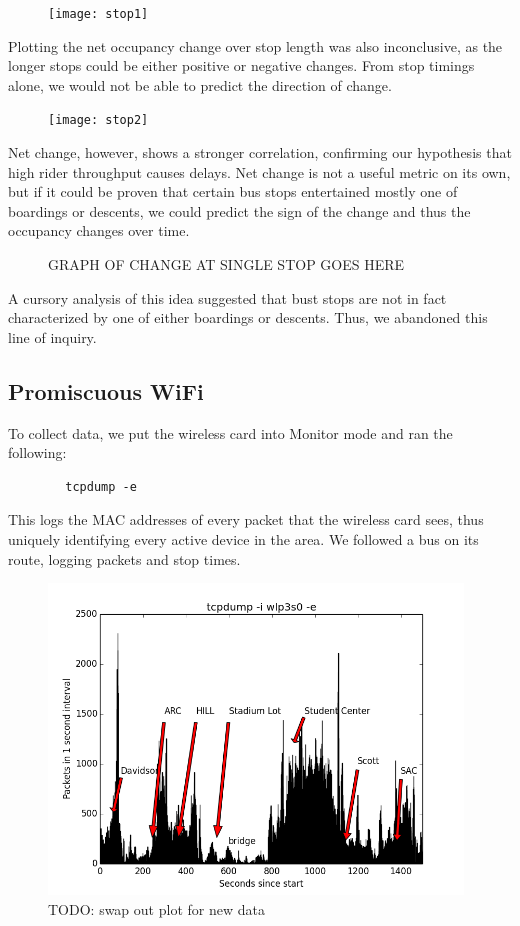 \documentclass[letterpaper]{scrartcl}
\begin{document}
	\begin{figure}[H]
	\texttt{[image: stop1]}
	\centering
	\end{figure}

	Plotting the net occupancy change over stop length was also inconclusive, as the longer stops could be either positive or negative changes.
	From stop timings alone, we would not be able to predict the direction of change.

	\begin{figure}[H]
	\texttt{[image: stop2]}
	\centering
	\end{figure}

	Net change, however, shows a stronger correlation, confirming our hypothesis that high rider throughput causes delays.
	Net change is not a useful metric on its own, but if it could be proven that certain bus stops entertained mostly one of boardings or descents, we could predict the sign of the change and thus the occupancy changes over time.

	\begin{figure}[H]
	GRAPH OF CHANGE AT SINGLE STOP GOES HERE
	\centering
	\end{figure}

	A cursory analysis of this idea suggested that bust stops are not in fact characterized by one of either boardings or descents.
	Thus, we abandoned this line of inquiry.


\subsection*{Promiscuous WiFi}
	To collect data, we put the wireless card into Monitor mode and ran the following:
	\begin{verbatim}
		tcpdump -e
	\end{verbatim}
	This logs the MAC addresses of every packet that the wireless card sees, thus uniquely identifying every active device in the area.
	We followed a bus on its route, logging packets and stop times.

	\begin{figure}[H]
	\includegraphics[width=11cm]{packets}
	\\TODO: swap out plot for new data
	\centering
	\end{figure}
\end{document}
